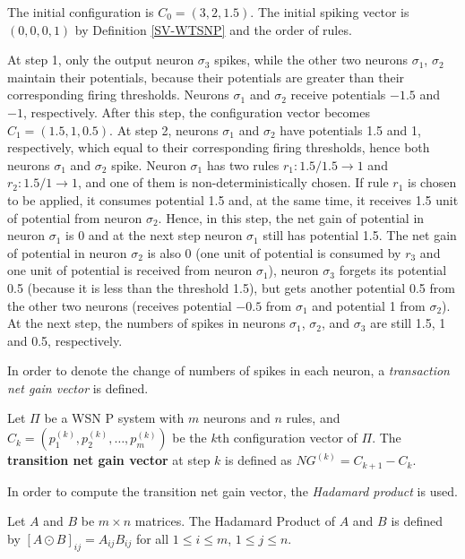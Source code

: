 \documentclass[runningheads]{llncs}
\begin{document}
The initial configuration is $C_{0} = (3,2,1.5)$. The initial
spiking vector is $(0,0,0,1)$ by Definition \ref{SV-WTSNP} and the
order of rules.


At step 1, only the output neuron $\sigma_3$ spikes, while the other
two neurons $\sigma_1$, $\sigma_2$ maintain their potentials,
because their potentials are greater than their corresponding firing
thresholds. Neurons $\sigma_1$ and $\sigma_2$ receive potentials
$-1.5$ and $-1$, respectively. After this step, the configuration
vector becomes $C_{1} = (1.5,1,0.5).$ At step 2, neurons $\sigma_1$
and $\sigma_2$ have potentials 1.5 and 1, respectively, which equal
to their corresponding firing thresholds, hence both neurons
$\sigma_1$ and $\sigma_2$ spike. Neuron $\sigma_1$ has two rules
$r_1:1.5/1.5\rightarrow 1$ and $r_2:1.5/1\rightarrow 1$, and one of
them is non-deterministically chosen. If rule $r_1$ is chosen to be
applied, it consumes potential 1.5 and, at the same time, it
receives 1.5 unit of potential from neuron $\sigma_2$. Hence, in
this step, the net gain of potential in neuron $\sigma_1$ is 0 and
at the next step neuron $\sigma_1$ still has potential 1.5. The net
gain of potential in neuron $\sigma_2$ is also 0 (one unit of
potential is consumed by $r_3$ and one unit of potential is received
from neuron $\sigma_1$), neuron $\sigma_3$ forgets its potential 0.5
(because it is less than the threshold 1.5), but gets another
potential 0.5 from the other two neurons (receives potential $-0.5$
from $\sigma_1$ and potential 1 from $\sigma_2$). At the next step,
the numbers of spikes in neurons $\sigma_1$, $\sigma_2$, and
$\sigma_3$ are still 1.5, 1 and 0.5, respectively.

In order to denote the change of numbers of spikes in each neuron, a
\emph{transaction net gain vector} is defined.

\begin{definition}
Let $\Pi$ be a WSN P system with $m$ neurons and $n$ rules, and
$C_{k} = (p_{1}^{(k)}, p_{2}^{(k)}, \ldots , p_{m}^{(k)})$ be the
$k$th configuration vector of $\Pi$. The {\bf transition net gain
vector} at step $k$ is defined as $NG^{(k)}= C_{k+1} -  C_{k}$.
\end{definition}

In order to compute the transition net gain vector, the
\emph{Hadamard product} is used.

\begin{definition} Let $A$ and $B$ be $m\times n$ matrices. The Hadamard
Product of $A$ and $B$ is defined by $[A\odot B]_{ij}=A_{ij}B_{ij}$
for all $1\leq i\leq m$, $1\leq j\leq n$.

\end{definition}
\end{document}
